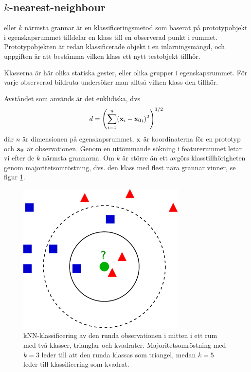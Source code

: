 \documentclass[../rapport_MVEX01-11-05]{subfiles}
\begin{document}
\subsection{$k$-nearest-neighbour}\label{sec:knn}

\knn eller $k$ närmsta grannar är en klassificeringsmetod som baserat
på
prototypobjekt i egenskapsrummet tilldelar en klass till en observerad
punkt i rummet.
Prototypobjekten är redan klassificerade objekt i en inlärningsmängd,
och uppgiften är att bestämma vilken klass ett nytt testobjekt tillhör.

Klasserna är här olika statiska gester, eller olika grupper i
egenskapsrummet. För
varje observerad bildruta undersöker man alltså vilken klass den tillhör.

Avståndet som används är det euklidiska, dvs
\begin{equation*}
    d = \left(\sum_{i=1}^n(\mathbf{x}_i-\mathbf{x_0}_i)^2\right)^{1/2}
\end{equation*}
där $n$ är dimensionen på egenskapsrummet, $\mathbf{x}$ är koordinaterna för en
prototyp och $\mathbf{x_0}$ är observationen. Genom en uttömmande sökning i
featurerummet letar vi efter de $k$ närmsta grannarna. Om $k$ är större än ett
avgörs klasstillhörigheten genom majoritetsomröstning, dvs. den klass med flest
nära grannar vinner, se figur \ref{fig:knn-overview}.

\begin{figure}[!htb]
    \begin{center}
\includegraphics[width=0.75\textwidth]{bilder/KnnClassification}
    \end{center}
    \caption{kNN-klassificering av den runda observationen i mitten i ett rum
    med två klasser, trianglar och kvadrater. Majoritetsomröstning
    med $k=3$ leder till att den runda klassas som triangel, medan $k=5$ leder
    till klassificering som kvadrat.}
    \label{fig:knn-overview}
\end{figure}
\end{document}
